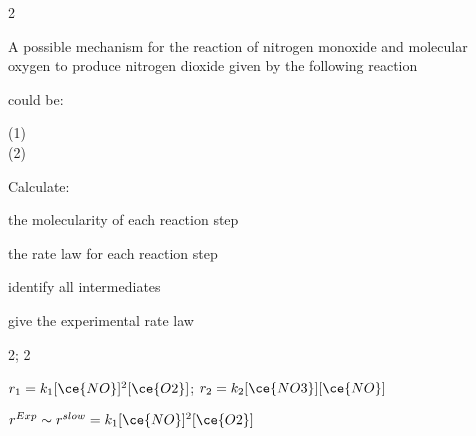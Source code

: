 \documentclass[main.tex]{subfiles}
\begin{document}
\begin{multicols*}{2}
\begin{question}[ID=\the\value{numA}]
A possible mechanism for the reaction of nitrogen monoxide and molecular oxygen to produce nitrogen dioxide given by the following reaction
  \begin{center}	\hfill \end{center}
could be:
  \begin{center}(1)\hfill{} \\
(2)\hfill{} 
\end{center}
Calculate: 
\begin{inparaenum}[(a)]	
\item  the molecularity of each reaction step %
\item  the rate law for each reaction step %
\item identify all intermediates %
\item give the experimental rate law %
 \end{inparaenum}
\end{question}
\begin{solution}
\begin{inparaenum}[(a)]
\item     2; 2 
\item      $r_1=k_1[\ce{NO}]^2[\ce{O2}]$; $r_2=k_2[\ce{NO3}][\ce{NO}]$		 
\item  {} 
\item   $r^{Exp}\sim r^{slow} = k_1[\ce{NO}]^2[\ce{O2}]$
 \end{inparaenum}
\hspace{0.1cm}\end{solution}%



\end{multicols*} \checkoddpage\ifoddpage \clearpage\thispagestyle{empty}\mbox{}\clearpage \else  \fi
{}\iftoggle{showfinalanswers}{
\begin{answerbox}
\begin{answersenvironment}
 \begin{localsize}{10}
{\Large \bf Answers}
\SetupExSheets{ headings = inline-nr , counter-format = qu) ,}
\printsolutions 
  \vspace{20cm}
 \end{localsize}
 \end{answersenvironment}
\end{answerbox}
}{}
\checkoddpage\ifoddpage \clearpage\thispagestyle{empty}\mbox{}\clearpage \else  \fi
\end{document}
